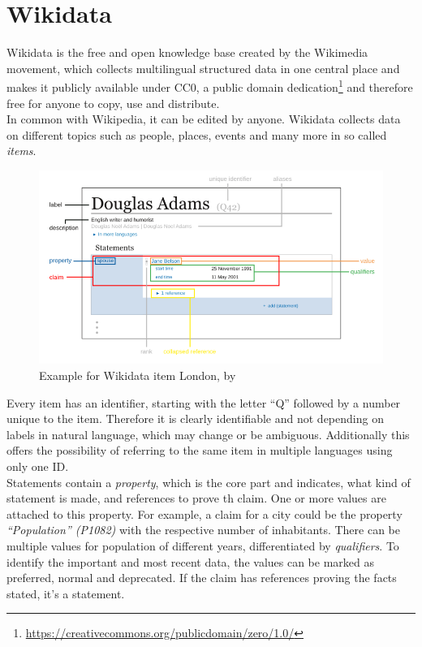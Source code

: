 \section{Wikidata}

Wikidata is the free and open knowledge base created by the Wikimedia movement, which collects multilingual structured data in one central place and makes it publicly available under CC0, a public domain dedication\footnote{\href{https://creativecommons.org/publicdomain/zero/1.0/}{https://creativecommons.org/publicdomain/zero/1.0/}} and therefore free for anyone to copy, use and distribute. \\
In common with Wikipedia, it can be edited by anyone. Wikidata collects data on different topics such as people, places, events and many more in so called \textit{items}.
\begin{figure}[H]
	\centering
	\includegraphics[width=\textwidth]{diagrams/Wikidata_statement.png}
	\caption{Example for Wikidata item London, by \citet{}}
	\label{diagramWikidataStatement}
\end{figure}
Every item has an identifier, starting with the letter ``Q'' followed by a number unique to the item. Therefore it is clearly identifiable and not depending on labels in natural language, which may change or be ambiguous. Additionally this offers the possibility of referring to the same item in multiple languages using only one ID. \\
Statements contain a \textit{property}, which is the core part and indicates, what kind of statement is made, and references to prove th claim. One or more values are attached to this property. For example, a claim for a city could be the property \textit{``Population'' (P1082)} with the respective number of inhabitants. There can be multiple values for population of different years, differentiated by \textit{qualifiers}. To identify the important and most recent data, the values can be marked as preferred, normal and deprecated. If the claim has references proving the facts stated, it's a statement. \\
